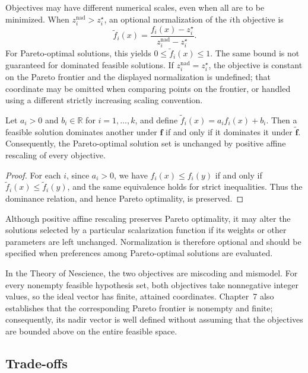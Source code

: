 Objectives may have different numerical scales, even when all are to be minimized. When $z_i^{\mathrm{nad}}>z_i^{\star}$, an optional normalization of the $i$th objective is
\[
\widetilde f_i(x)=
\frac{f_i(x)-z_i^{\star}}
     {z_i^{\mathrm{nad}}-z_i^{\star}}.
\]
For Pareto-optimal solutions, this yields $0\leq\widetilde f_i(x)\leq1$. The same bound is not guaranteed for dominated feasible solutions. If $z_i^{\mathrm{nad}}=z_i^{\star}$, the objective is constant on the Pareto frontier and the displayed normalization is undefined; that coordinate may be omitted when comparing points on the frontier, or handled using a different strictly increasing scaling convention.

\begin{proposition}
\label{prop:positive_scaling_pareto}
Let $a_i>0$ and $b_i\in\mathbb{R}$ for $i=1,\ldots,k$, and define $\widetilde f_i(x)=a_i f_i(x)+b_i$. Then a feasible solution dominates another under $\mathbf{f}$ if and only if it dominates it under $\widetilde{\mathbf{f}}$. Consequently, the Pareto-optimal solution set is unchanged by positive affine rescaling of every objective.
\end{proposition}
\begin{proof}
For each $i$, since $a_i>0$, we have $f_i(x)\leq f_i(y)$ if and only if $\widetilde f_i(x)\leq\widetilde f_i(y)$, and the same equivalence holds for strict inequalities. Thus the dominance relation, and hence Pareto optimality, is preserved.
\end{proof}

Although positive affine rescaling preserves Pareto optimality, it may alter the solutions selected by a particular scalarization function if its weights or other parameters are left unchanged. Normalization is therefore optional and should be specified when preferences among Pareto-optimal solutions are evaluated.

In the Theory of Nescience, the two objectives are miscoding and mismodel. For every nonempty feasible hypothesis set, both objectives take nonnegative integer values, so the ideal vector has finite, attained coordinates. Chapter~7 also establishes that the corresponding Pareto frontier is nonempty and finite; consequently, its nadir vector is well defined without assuming that the objectives are bounded above on the entire feasible space.


\subsection*{Trade-offs}
\label{sec:trade_offs}

